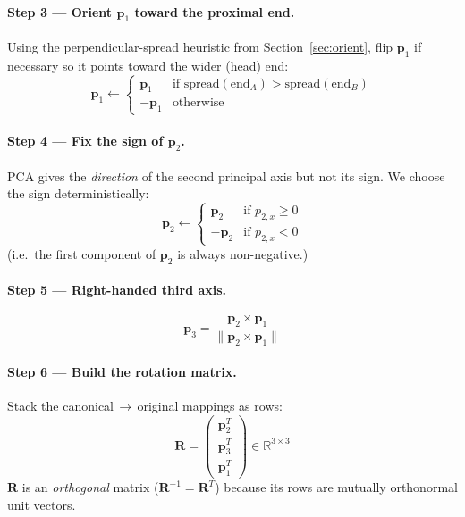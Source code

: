 \documentclass[12pt,a4paper]{article}
\begin{document}
\paragraph{Step 3 — Orient $\mathbf{p}_1$ toward the proximal end.}
Using the perpendicular-spread heuristic from Section~\ref{sec:orient}, flip
$\mathbf{p}_1$ if necessary so it points toward the wider (head) end:
\begin{equation}
    \mathbf{p}_1 \leftarrow
    \begin{cases}
        \mathbf{p}_1  & \text{if spread}(\text{end}_A) > \text{spread}(\text{end}_B) \\
        -\mathbf{p}_1 & \text{otherwise}
    \end{cases}
\end{equation}

\paragraph{Step 4 — Fix the sign of $\mathbf{p}_2$.}
PCA gives the \emph{direction} of the second principal axis but not its sign.  We
choose the sign deterministically:
\begin{equation}
    \mathbf{p}_2 \leftarrow
    \begin{cases}
        \mathbf{p}_2  & \text{if } p_{2,x} \geq 0 \\
        -\mathbf{p}_2 & \text{if } p_{2,x} < 0
    \end{cases}
\end{equation}
(i.e.\ the first component of $\mathbf{p}_2$ is always non-negative.)

\paragraph{Step 5 — Right-handed third axis.}
\begin{equation}
    \mathbf{p}_3 = \frac{\mathbf{p}_2 \times \mathbf{p}_1}
                         {\|\mathbf{p}_2 \times \mathbf{p}_1\|}
\end{equation}

\paragraph{Step 6 — Build the rotation matrix.}
Stack the canonical\,$\to$\,original mappings as rows:
\begin{equation}
    \boxed{
        \mathbf{R} =
        \begin{pmatrix}
            \mathbf{p}_2^T \\
            \mathbf{p}_3^T \\
            \mathbf{p}_1^T
        \end{pmatrix}
        \in \mathbb{R}^{3 \times 3}
    }
    \label{eq:rotmat}
\end{equation}
$\mathbf{R}$ is an \emph{orthogonal} matrix ($\mathbf{R}^{-1} = \mathbf{R}^T$)
because its rows are mutually orthonormal unit vectors.
\end{document}
